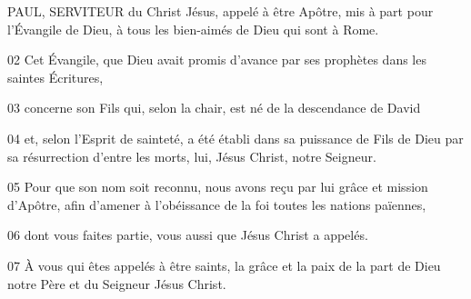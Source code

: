 PAUL, SERVITEUR du Christ Jésus, appelé à être Apôtre, mis à part pour l’Évangile de Dieu, à tous les bien-aimés de Dieu qui sont à Rome.

02 Cet Évangile, que Dieu avait promis d’avance par ses prophètes dans les saintes Écritures,

03 concerne son Fils qui, selon la chair, est né de la descendance de David

04 et, selon l’Esprit de sainteté, a été établi dans sa puissance de Fils de Dieu par sa résurrection d’entre les morts, lui, Jésus Christ, notre Seigneur.

05 Pour que son nom soit reconnu, nous avons reçu par lui grâce et mission d’Apôtre, afin d’amener à l’obéissance de la foi toutes les nations païennes,

06 dont vous faites partie, vous aussi que Jésus Christ a appelés.

07 À vous qui êtes appelés à être saints, la grâce et la paix de la part de Dieu notre Père et du Seigneur Jésus Christ.
